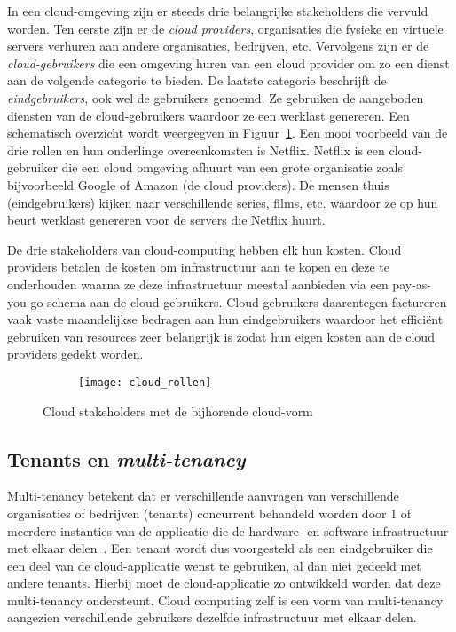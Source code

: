 In een cloud-omgeving zijn er steeds drie belangrijke stakeholders die vervuld worden. Ten eerste zijn er de \textit{cloud providers}, organisaties die fysieke en virtuele servers verhuren aan andere organisaties, bedrijven, etc. Vervolgens zijn er de \textit{cloud-gebruikers} die een omgeving huren van een cloud provider om zo een dienst aan de volgende categorie te bieden. De laatste categorie beschrijft de \textit{eindgebruikers}, ook wel de gebruikers genoemd. Ze gebruiken de aangeboden diensten van de cloud-gebruikers waardoor ze een werklast genereren. Een schematisch overzicht wordt weergegven in Figuur~\ref{fig:cloud_rollen}. Een mooi voorbeeld van de drie rollen en hun onderlinge overeenkomsten is Netflix. Netflix is een cloud-gebruiker die een cloud omgeving afhuurt van een grote organisatie zoals bijvoorbeeld Google of Amazon (de cloud providers). De mensen thuis (eindgebruikers) kijken naar verschillende series, films, etc. waardoor ze op hun beurt werklast genereren voor de servers die Netflix huurt.

De drie stakeholders van cloud-computing hebben elk hun kosten. Cloud providers betalen de kosten om infrastructuur aan te kopen en deze te onderhouden waarna ze deze infrastructuur meestal aanbieden via een pay-as-you-go schema aan de cloud-gebruikers. Cloud-gebruikers daarentegen factureren vaak vaste maandelijkse bedragen aan hun eindgebruikers waardoor het efficiënt gebruiken van resources zeer belangrijk is zodat hun eigen kosten aan de cloud providers gedekt worden.

\begin{figure}
	\centering
	\begin{subfigure}{\textwidth}
		\centering
		\centerline{
			\texttt{[image: cloud\_rollen]}
		}
	\end{subfigure}
	\caption{Cloud stakeholders met de bijhorende cloud-vorm}
	\label{fig:cloud_rollen}
\end{figure}

\subsection{Tenants en \textit{multi-tenancy}}

Multi-tenancy betekent dat er verschillende aanvragen van verschillende organisaties of bedrijven (tenants) concurrent behandeld worden door 1 of meerdere instanties van de applicatie die de hardware- en software-infrastructuur met elkaar delen~\cite{Guo2007}. Een tenant wordt dus voorgesteld als een eindgebruiker die een deel van de cloud-applicatie wenst te gebruiken, al dan niet gedeeld met andere tenants. Hierbij moet de cloud-applicatie zo ontwikkeld worden dat deze multi-tenancy ondersteunt. Cloud computing zelf is een vorm van multi-tenancy aangezien verschillende gebruikers dezelfde infrastructuur met elkaar delen.

